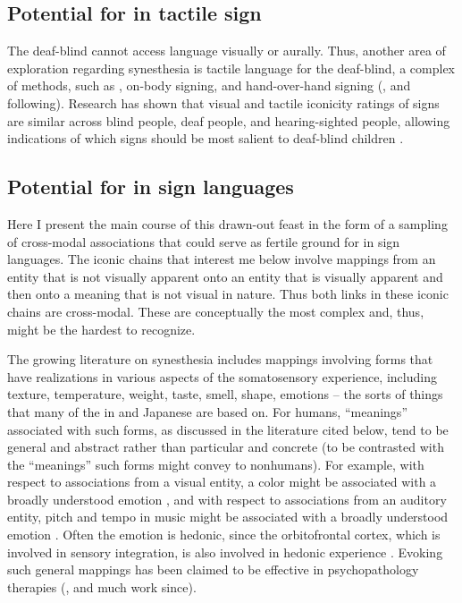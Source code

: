 \documentclass[output=paper,
modfonts
]{LSP/langsci}
\begin{document}
\subsection{Potential for  in tactile sign}

The deaf-blind cannot access language visually or aurally. Thus, another
area of exploration regarding synesthesia is tactile language for the
deaf-blind, a complex of methods, such as , on-body
signing, and hand-over-hand signing (\citealt{edwards2012}, and following).
Research has shown that visual and tactile iconicity ratings of signs
are similar across blind people, deaf people, and hearing-sighted
people, allowing indications of which signs should be most salient to
deaf-blind children \citep{griffith1983}.

\subsection{Potential for  in sign languages}

Here I present the main course of this drawn-out feast in the form of a
sampling of cross-modal associations that could serve as fertile ground
for  in sign languages. The iconic chains that interest
me below involve mappings from an entity that is not visually apparent
onto an entity that is visually apparent and then onto a meaning that is
not visual in nature. Thus both links in these iconic chains are
cross-modal. These are conceptually the most complex 
and, thus, might be the hardest to recognize.

The growing literature on synesthesia includes mappings involving forms
that have realizations in various aspects of the somatosensory
experience, including texture, temperature, weight, taste, smell, shape,
emotions -- the sorts of things that many of the  in  and
Japanese are based on. For humans, ``meanings'' associated with such
forms, as discussed in the literature cited below, tend to be general
and abstract rather than particular and concrete (to be contrasted with
the ``meanings'' such forms might convey to nonhumans). For example, with
respect to associations from a visual entity, a color might be
associated with a broadly understood emotion \citep{johnson1986}, and with respect to associations from an auditory entity,
pitch and tempo in music might be associated with a broadly understood
emotion \citep{hevner1937,brower2000}. Often the emotion is hedonic, since
the orbitofrontal cortex, which is involved in sensory integration, is
also involved in hedonic experience \citep{kringelbach2005}. Evoking such
general mappings has been claimed to be effective in psychopathology
therapies (\citealt{lang1979}, and much work since).
\end{document}
